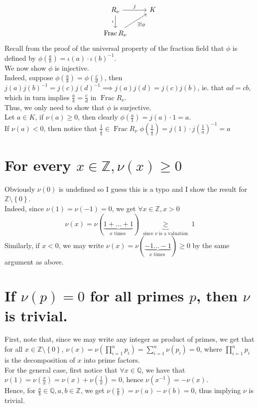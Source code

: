 \documentclass[11pt, a4paper]{article}
\DeclareMathOperator{\fr}{Frac}
\begin{document}
\[\begin{tikzcd}
	{R_\nu} & K \\
	{\fr R_\nu}
	\arrow["j", from=1-1, to=1-2]
	\arrow["\iota"', from=1-1, to=2-1]
	\arrow["{\exists ! \phi}"', from=2-1, to=1-2]
\end{tikzcd}\]
Recall from the proof of the universal property of the fraction field that $\phi$ is defined by
$\phi( \frac{a}{b}) = \iota( a) \cdot \iota( b) ^{-1}$.\\
We now show $\phi$ is injective.\\
Indeed, suppose $\phi( \frac{a}{b}) = \phi( \frac{c}{d}) $, then $j ( a) j( b) ^{-1}= j( c) j( d)^{-1}\implies j(a ) j( d) = j( c) j(b) $, ie. that $ad= cb$, which in turn implies $\frac{a}{b}= \frac{c}{d}$ in $ \fr R_\nu$.\\
Thus, we only need to show that $\phi$ is surjective.\\
Let $a\in K$, if $\nu( a) \geq 0$, then clearly $ \phi( \frac{a}{1}) = j( a) \cdot 1= a$.\\
If $\nu( a) <0$, then notice that $\frac{1}{\frac{1}{a}}\in \fr R_\nu$  $\phi( \frac{1}{\frac{1}{a}}) = j( 1) \cdot j( \frac{1}{a})^{-1} = a $ 
\section{ For every $x\in \mathbb{Z}, \nu( x) \geq 0$ }
Obviously $ \nu( 0) $ is undefined so I guess this is a typo and I show the result for $ \mathbb{Z}\setminus \left\{ 0 \right\} $.\\

Indeed, since $\nu( 1) =\nu( -1) =0$, we get $\forall x \in \mathbb{Z}, x >0$ 
\[ 
\nu(x) = \nu( \underbrace{1+\ldots + 1}_{ x \text{ times } }) \underbrace{\geq}_{ \text{ since $\nu$ is a valuation } } 1 
\]
Similarly, if $x<0$, we may write $ \nu( x) = \nu( \underbrace{-1\ldots-1}_{x \text{ times } }) \geq 0 $ by the same argument as above.
\section{ If $\nu( p) =0$ for all primes $p$, then $\nu$ is trivial.}
First, note that, since we may write any integer as product of primes, we get that for all $x\in \mathbb{Z}\setminus \left\{ 0 \right\} $, $\nu( x) = \nu\left( \prod_{i=1}^{n} p_i\right) = \sum_{i=1}^{ n} \nu( p_i) = 0 $, where $\prod_{i=1}^{n}p_i$ is the decomposition of $x$ into prime factors.\\
For the general case, first notice that $\forall x\in \mathbb{Q}$, we have that $\nu( 1) = \nu( \frac{x}{x}) = \nu( x ) +\nu( \frac{1}{x}) =0$, hence $\nu( x^{-1}) = -\nu( x) $.\\
Hence, for $\frac{a}{b}\in \mathbb{Q}, a,b \in \mathbb{Z}$, we get $\nu( \frac{a}{b})= \nu( a ) -\nu( b) =0 $, thus implying $\nu$  is trivial.
\end{document}
